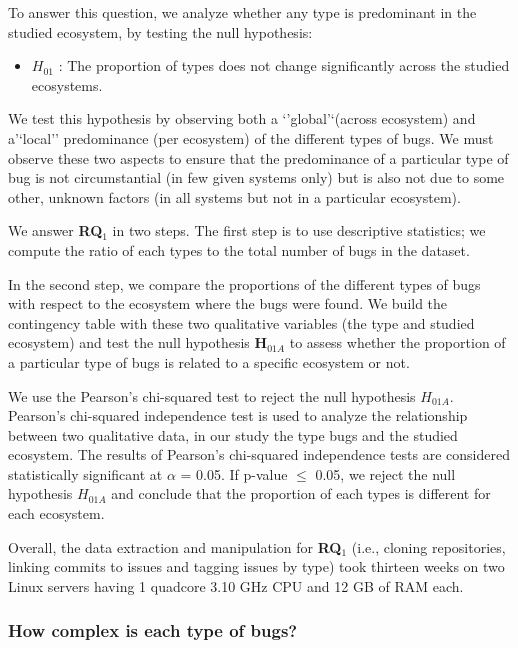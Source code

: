 To answer this question, we analyze whether any type is predominant in
the studied ecosystem, by testing the null hypothesis:

\begin{itemize}
\tightlist
\item
  \(H_{01}\) : The proportion of types does not change significantly
  across the studied ecosystems.
\end{itemize}

We test this hypothesis by observing both a `'global'`(across ecosystem)
and a'`local'' predominance (per ecosystem) of the different types of
bugs. We must observe these two aspects to ensure that the predominance
of a particular type of bug is not circumstantial (in few given systems
only) but is also not due to some other, unknown factors (in all systems
but not in a particular ecosystem).

We answer \textbf{RQ\(_1\)} in two steps. The first step is to use
descriptive statistics; we compute the ratio of each types to the total
number of bugs in the dataset.

In the second step, we compare the proportions of the different types of
bugs with respect to the ecosystem where the bugs were found. We build
the contingency table with these two qualitative variables (the type and
studied ecosystem) and test the null hypothesis \textbf{H\(_{01A}\)} to
assess whether the proportion of a particular type of bugs is related to
a specific ecosystem or not.

We use the Pearson's chi-squared test to reject the null hypothesis
\(H_{01A}\). Pearson's chi-squared independence test is used to analyze
the relationship between two qualitative data, in our study the type
bugs and the studied ecosystem. The results of Pearson's chi-squared
independence tests are considered statistically significant at
\(\alpha\) = 0.05. If p-value \(\le\) 0.05, we reject the null
hypothesis \(H_{01A}\) and conclude that the proportion of each types is
different for each ecosystem.

Overall, the data extraction and manipulation for \textbf{RQ\(_1\)}
(i.e., cloning repositories, linking commits to issues and tagging
issues by type) took thirteen weeks on two Linux servers having 1
quadcore 3.10 GHz CPU and 12 GB of RAM each.

\subsubsection{How complex is each type of
bugs?}\label{how-complex-is-each-type-of-bugs}

